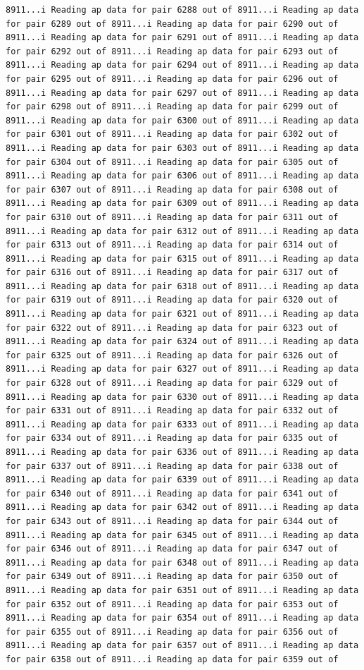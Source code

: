 \documentclass[
]{article}
\begin{document}
\begin{verbatim}
8911...i Reading ap data for pair 6288 out of 8911...i Reading ap data for pair 6289 out of 8911...i Reading ap data for pair 6290 out of 8911...i Reading ap data for pair 6291 out of 8911...i Reading ap data for pair 6292 out of 8911...i Reading ap data for pair 6293 out of 8911...i Reading ap data for pair 6294 out of 8911...i Reading ap data for pair 6295 out of 8911...i Reading ap data for pair 6296 out of 8911...i Reading ap data for pair 6297 out of 8911...i Reading ap data for pair 6298 out of 8911...i Reading ap data for pair 6299 out of 8911...i Reading ap data for pair 6300 out of 8911...i Reading ap data for pair 6301 out of 8911...i Reading ap data for pair 6302 out of 8911...i Reading ap data for pair 6303 out of 8911...i Reading ap data for pair 6304 out of 8911...i Reading ap data for pair 6305 out of 8911...i Reading ap data for pair 6306 out of 8911...i Reading ap data for pair 6307 out of 8911...i Reading ap data for pair 6308 out of 8911...i Reading ap data for pair 6309 out of 8911...i Reading ap data for pair 6310 out of 8911...i Reading ap data for pair 6311 out of 8911...i Reading ap data for pair 6312 out of 8911...i Reading ap data for pair 6313 out of 8911...i Reading ap data for pair 6314 out of 8911...i Reading ap data for pair 6315 out of 8911...i Reading ap data for pair 6316 out of 8911...i Reading ap data for pair 6317 out of 8911...i Reading ap data for pair 6318 out of 8911...i Reading ap data for pair 6319 out of 8911...i Reading ap data for pair 6320 out of 8911...i Reading ap data for pair 6321 out of 8911...i Reading ap data for pair 6322 out of 8911...i Reading ap data for pair 6323 out of 8911...i Reading ap data for pair 6324 out of 8911...i Reading ap data for pair 6325 out of 8911...i Reading ap data for pair 6326 out of 8911...i Reading ap data for pair 6327 out of 8911...i Reading ap data for pair 6328 out of 8911...i Reading ap data for pair 6329 out of 8911...i Reading ap data for pair 6330 out of 8911...i Reading ap data for pair 6331 out of 8911...i Reading ap data for pair 6332 out of 8911...i Reading ap data for pair 6333 out of 8911...i Reading ap data for pair 6334 out of 8911...i Reading ap data for pair 6335 out of 8911...i Reading ap data for pair 6336 out of 8911...i Reading ap data for pair 6337 out of 8911...i Reading ap data for pair 6338 out of 8911...i Reading ap data for pair 6339 out of 8911...i Reading ap data for pair 6340 out of 8911...i Reading ap data for pair 6341 out of 8911...i Reading ap data for pair 6342 out of 8911...i Reading ap data for pair 6343 out of 8911...i Reading ap data for pair 6344 out of 8911...i Reading ap data for pair 6345 out of 8911...i Reading ap data for pair 6346 out of 8911...i Reading ap data for pair 6347 out of 8911...i Reading ap data for pair 6348 out of 8911...i Reading ap data for pair 6349 out of 8911...i Reading ap data for pair 6350 out of 8911...i Reading ap data for pair 6351 out of 8911...i Reading ap data for pair 6352 out of 8911...i Reading ap data for pair 6353 out of 8911...i Reading ap data for pair 6354 out of 8911...i Reading ap data for pair 6355 out of 8911...i Reading ap data for pair 6356 out of 8911...i Reading ap data for pair 6357 out of 8911...i Reading ap data for pair 6358 out of 8911...i Reading ap data for pair 6359 out of 
\end{verbatim}
\end{document}
